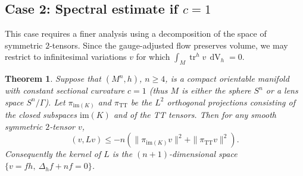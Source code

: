 \documentclass[10pt,reqno]{amsart}
\newtheorem{theorem}{Theorem}[section]
\DeclareMathOperator{\tr}{tr}
\DeclareMathOperator{\dvol}{dV}
\begin{document}
\bigskip

\subsection {\bf Case 2: Spectral estimate if $c=1$} 

This case requires a finer analysis using a decomposition of the space of symmetric $2$-tensors.  Since the gauge-adjusted flow preserves volume, 
we may restrict to infinitesimal variations $v$ for which $\int_{M} \tr^h v \, \dvol_h = 0$.

\begin{theorem} \label{thm:main1b}
Suppose that $(M^n,h)$, $n \geq 4$, is a compact orientable manifold with constant sectional curvature $c=1$ (thus $M$ is either the sphere $S^n$ or 
a lens space $S^n/\Gamma$). Let $\pi_{\mathrm{im}(K)}$ and $ \pi_{\mathrm{TT}}$ be the $L^2$ orthogonal projections consisting of the closed subspaces 
$\mathrm{im}(K)$ and of the TT tensors. Then for any smooth symmetric $2$-tensor $v$, 
\[ 
(v,Lv) \leq -n \left( \| \pi_{\mathrm{im}(K)} v \|^2  + \| \pi_{\mathrm{TT}} v \|^2\right). 
\]
Consequently the kernel of $L$ is the $(n+1)$-dimensional space $\{v = f h,\ \Delta_{h} f + nf = 0\}$.
\end{theorem}
\end{document}
